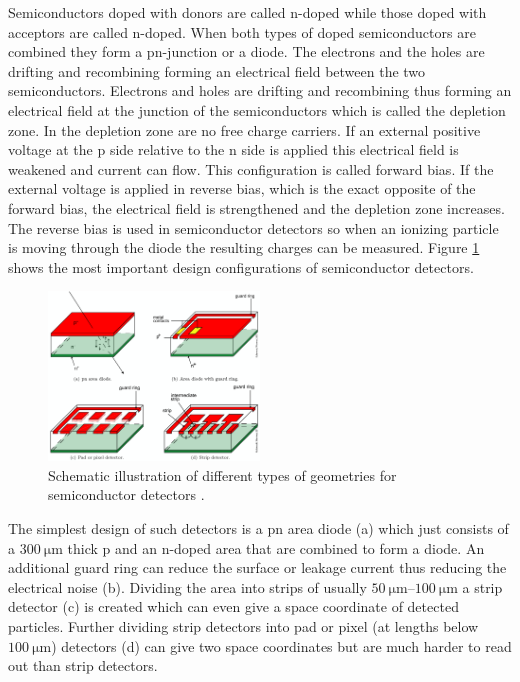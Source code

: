 Semiconductors doped with donors are called n-doped while those doped with acceptors are called n-doped.
When both types of doped semiconductors are combined they form a pn-junction or a diode.
The electrons and the holes are drifting and recombining forming an electrical field between the two semiconductors.
Electrons and holes are drifting and recombining thus forming an electrical field at the junction of the semiconductors which is called the depletion zone.
In the depletion zone are no free charge carriers.
If an external positive voltage at the p side relative to the n side is applied this electrical field is weakened and current can flow.
This configuration is called forward bias.
If the external voltage is applied in reverse bias, which is the exact opposite of the forward bias, the electrical field is strengthened and the depletion zone increases.
The reverse bias is used in semiconductor detectors so when an ionizing particle is moving through the diode the resulting charges can be measured.
Figure \ref{fig:geometries} shows the most important design configurations of semiconductor detectors.
\begin{figure}
    \centering
    \includegraphics[width=0.5\textwidth]{figs/geometry.png}
    \caption{Schematic illustration of different types of geometries for semiconductor detectors \cite{KolanoskiWermes}.}
    \label{fig:geometries}
\end{figure}
The simplest design of such detectors is a pn area diode (a) which just consists of a $\SI{300}{\micro\meter}$ thick p and an n-doped area that are combined to form a diode.
An additional guard ring can reduce the surface or leakage current thus reducing the electrical noise (b).
Dividing the area into strips of usually $\SIrange{50}{100}{\micro\meter}$ a strip detector (c) is created which can even give a space coordinate of detected particles.
Further dividing strip detectors into pad or pixel (at lengths below $\SI{100}{\micro\meter}$) detectors (d) can give two space coordinates but are much harder to read out than strip detectors.
